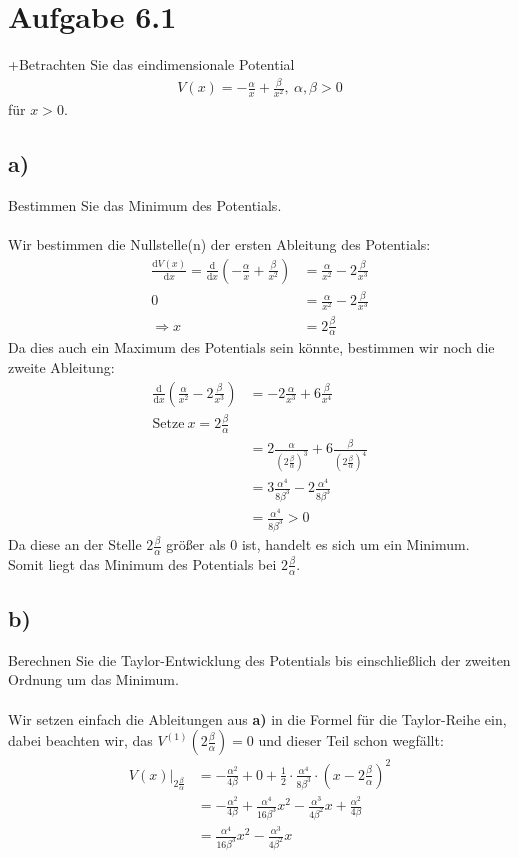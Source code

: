 \documentclass{theozettel}
\begin{document}

\section*{Aufgabe 6.1} 
+Betrachten Sie das eindimensionale Potential
\begin{align*}
V\left(x\right)=-\frac{\alpha}{x}+\frac{\beta}{x^2}, \ \alpha,\beta>0
\end{align*}
für $x>0$.
\subsection*{a)}
Bestimmen Sie das Minimum des Potentials.\\\\
Wir bestimmen die Nullstelle(n) der ersten Ableitung des Potentials:
\begin{align*}
\frac{\text{d}V\left(x\right)}{\text{d}x}=\frac{\text{d}}{\text{d}x}\left(-\frac{\alpha}{x}+\frac{\beta}{x^2}\right)&=\frac{\alpha}{x^2}-2\frac{\beta}{x^3}\\
0&=\frac{\alpha}{x^2}-2\frac{\beta}{x^3}\\
\Rightarrow x&=2\frac{\beta}{\alpha}
\end{align*}
Da dies auch ein Maximum des Potentials sein könnte, bestimmen wir noch die zweite Ableitung:
\begin{align*}
\frac{\text{d}}{\text{d}x}\left(\frac{\alpha}{x^2}-2\frac{\beta}{x^3}\right)&=-2\frac{\alpha}{x^3}+6\frac{\beta}{x^4}\\
\text{Setze} \ x=2\frac{\beta}{\alpha}&\\
&=2\frac{\alpha}{\left(2\frac{\beta}{\alpha}\right)^3}
+6\frac{\beta}{\left(2\frac{\beta}{\alpha}\right)^4}\\
&=3\frac{\alpha^4}{8\beta^3}-2\frac{\alpha^4}{8\beta^3}\\
&=\frac{\alpha^4}{8\beta^3}>0
\end{align*}
Da diese an der Stelle $2\frac{\beta}{\alpha}$ größer als $0$ ist, handelt es sich um ein Minimum.\\
Somit liegt das Minimum des Potentials bei $2\frac{\beta}{\alpha}$.
\subsection*{b)}
Berechnen Sie die Taylor-Entwicklung des Potentials bis einschließlich der zweiten Ordnung um das Minimum.\\\\
Wir setzen einfach die Ableitungen aus \textbf{a)} in die Formel für die Taylor-Reihe ein, dabei beachten wir, das $V^{\left(1\right)}\left(2\frac{\beta}{\alpha}\right)=0$ und dieser Teil schon wegfällt:
\begin{align*}
V\left(x\right)\big|_{2\frac{\beta}{\alpha}}&=-\frac{\alpha^2}{4\beta}+0+\frac{1}{2}\cdot\frac{\alpha^4}{8\beta^3}\cdot\left(x-2\frac{\beta}{\alpha}\right)^2\\
&=-\frac{\alpha^2}{4\beta}+\frac{\alpha^4}{16\beta^3}x^2-\frac{\alpha^3}{4\beta^2}x+\frac{\alpha^2}{4\beta}\\
&=\frac{\alpha^4}{16\beta^3}x^2-\frac{\alpha^3}{4\beta^2}x
\end{align*}
\end{document}
